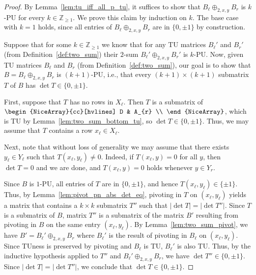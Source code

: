 \begin{proof}
    By Lemma~\ref{lem:tu_iff_all_p_tu}, it suffices to show that $B_{\ell} \oplus_{2, x, y} B_{r}$ is $k$-PU for every $k \in \mathbb{Z}_{\geq 1}$. We prove this claim by induction on $k$. The base case with $k = 1$ holds, since all entries of $B_{\ell} \oplus_{2, x, y} B_{r}$ are in $\{0, \pm 1\}$ by construction.

    Suppose that for some $k \in \mathbb{Z}_{\geq 1}$ we know that for any TU matrices $B_{\ell}'$ and $B_{r}'$ (from Definition~\ref{def:two_sum}) their $2$-sum $B_{\ell}' \oplus_{2, x, y} B_{r}'$ is $k$-PU. Now, given TU matrices $B_{\ell}$ and $B_{r}$ (from Definition~\ref{def:two_sum}), our goal is to show that $B = B_{\ell} \oplus_{2, x, y} B_{r}$ is $(k + 1)$-PU, i.e., that every $(k + 1) \times (k + 1)$ submatrix $T$ of $B$ has $\det T \in \{0, \pm 1\}$.

    First, suppose that $T$ has no rows in $X_{\ell}$. Then $T$ is a submatrix of $\begin{NiceArray}{cc}[hvlines] D & A_{r} \\ \end{NiceArray}$, which is TU by Lemma~\ref{lem:two_sum_bottom_tu}, so $\det T \in \{0, \pm 1\}$. Thus, we may assume that $T$ contains a row $x_{\ell} \in X_{\ell}$.

    Next, note that without loss of generality we may assume that there exists $y_{\ell} \in Y_{\ell}$ such that $T (x_{\ell}, y_{\ell}) \neq 0$. Indeed, if $T (x_{\ell}, y) = 0$ for all $y$, then $\det T = 0$ and we are done, and $T (x_{\ell}, y) = 0$ holds whenever $y \in Y_{r}$.

    Since $B$ is $1$-PU, all entries of $T$ are in $\{0, \pm 1\}$, and hence $T (x_{\ell}, y_{\ell}) \in \{\pm 1\}$. Thus, by Lemma~\ref{lem:pivot_pn_abs_det_eq}, pivoting in $T$ on $(x_{\ell}, y_{\ell})$ yields a matrix that contains a $k \times k$ submatrix $T''$ such that $|\det T| = |\det T''|$. Since $T$ is a submatrix of $B$, matrix $T''$ is a submatrix of the matrix $B'$ resulting from pivoting in $B$ on the same entry $(x_{\ell}, y_{\ell})$. By Lemma~\ref{lem:two_sum_pivot}, we have $B' = B_{\ell}' \oplus_{2, x, y} B_{r}$ where $B_{\ell}'$ is the result of pivoting in $B_{\ell}$ on $(x_{\ell}, y_{\ell})$. Since TUness is preserved by pivoting and $B_{\ell}$ is TU, $B_{\ell}'$ is also TU. Thus, by the inductive hypothesis applied to $T''$ and $B_{\ell}' \oplus_{2, x, y} B_{r}$, we have $\det T'' \in \{0, \pm 1\}$. Since $|\det T| = |\det T''|$, we conclude that $\det T \in \{0, \pm 1\}$.
\end{proof}


